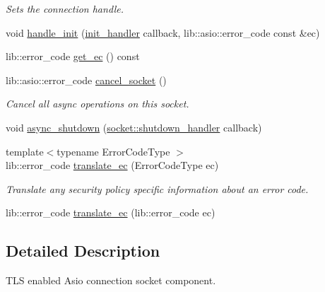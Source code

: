 \begin{DoxyCompactItemize}
\begin{DoxyCompactList}\small\item\em Sets the connection handle. \end{DoxyCompactList}\item 
void \hyperlink{classwebsocketpp_1_1transport_1_1asio_1_1tls__socket_1_1connection_a83d9c15ccd470b56d4ed55086a9286cb}{handle\+\_\+init} (\hyperlink{namespacewebsocketpp_1_1transport_aeae75e675c1a334b3b33ab7120b480a5}{init\+\_\+handler} callback, lib\+::asio\+::error\+\_\+code const \&ec)
\item 
lib\+::error\+\_\+code \hyperlink{classwebsocketpp_1_1transport_1_1asio_1_1tls__socket_1_1connection_aa715317153888d7cd389ebabd47066d2}{get\+\_\+ec} () const 
\item 
lib\+::asio\+::error\+\_\+code \hyperlink{classwebsocketpp_1_1transport_1_1asio_1_1tls__socket_1_1connection_af1fb297f14e4d010ce4a7aa352509611}{cancel\+\_\+socket} ()
\begin{DoxyCompactList}\small\item\em Cancel all async operations on this socket. \end{DoxyCompactList}\item 
void \hyperlink{classwebsocketpp_1_1transport_1_1asio_1_1tls__socket_1_1connection_a2f1935691c0b018206533ce3e1d4058f}{async\+\_\+shutdown} (\hyperlink{namespacewebsocketpp_1_1transport_1_1asio_1_1socket_a864ed8b0d8fa1a92a5f016c112efc4ad}{socket\+::shutdown\+\_\+handler} callback)
\item 
{\footnotesize template$<$typename Error\+Code\+Type $>$ }\\lib\+::error\+\_\+code \hyperlink{classwebsocketpp_1_1transport_1_1asio_1_1tls__socket_1_1connection_a64279c2aa16298902ba5bd3177ec3b5b}{translate\+\_\+ec} (Error\+Code\+Type ec)
\begin{DoxyCompactList}\small\item\em Translate any security policy specific information about an error code. \end{DoxyCompactList}\item 
lib\+::error\+\_\+code \hyperlink{classwebsocketpp_1_1transport_1_1asio_1_1tls__socket_1_1connection_a87860f93e9837fc0f86844bcf86ee83c}{translate\+\_\+ec} (lib\+::error\+\_\+code ec)
\end{DoxyCompactItemize}


\subsection{Detailed Description}
T\+L\+S enabled Asio connection socket component. 


